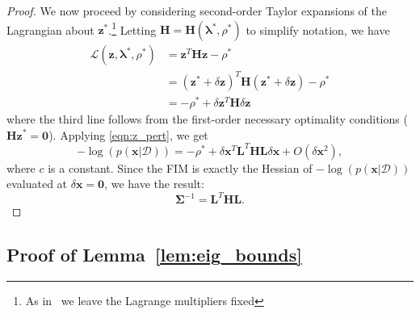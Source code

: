 \documentclass[lettersize,journal]{IEEEtran}
\begin{document}
\begin{proof}
We now proceed by considering second-order Taylor expansions of the Lagrangian about $\bm{z}^*$.\footnote{As in~\cite[Theorem 12.5]{nocedalNumericalOptimization2006} we leave the Lagrange multipliers fixed} Letting  $\bm{H}= \bm{H}(\bm{\lambda}^*, \rho^*)$ to simplify notation, we have
\begin{align*}
	\mathcal{L}(\bm{z},\bm{\lambda}^*, \rho^*) & =\bm{z}^T \bm{H} \bm{z} - \rho^* \\ 
	&= (\bm{z}^*+\delta\bm{z})^T \bm{H} (\bm{z}^*+\delta\bm{z}) - \rho^* \\ 
	&= -\rho^* + \delta\bm{z}^T \bm{H}\delta\bm{z}
\end{align*}
where the third line follows from the first-order necessary optimality conditions ($\bm{H} \bm{z}^*=\bm{0}$). Applying \eqref{eqn:z_pert}, we get
\begin{equation*}
	-\log(p(\bm{x} \vert \bm{\mathcal{D}})) = -\rho^* + \delta\bm{x}^T \bm{L}^T\bm{H}\bm{L}\delta\bm{x} + O(\delta\bm{x}^2),
\end{equation*}
where $c$ is a constant. Since the FIM is exactly the Hessian of $-\log(p(\bm{x} \vert \bm{\mathcal{D}}))$ evaluated at $\delta\bm{x} = \bm{0}$, we have the result:
\begin{equation}
	\bm{\Sigma}^{-1} = \bm{L}^T\bm{H}\bm{L}.
\end{equation}
\end{proof}

\subsection{Proof of Lemma~\ref{lem:eig_bounds}}\label{App:lem2Proof}
\end{document}
